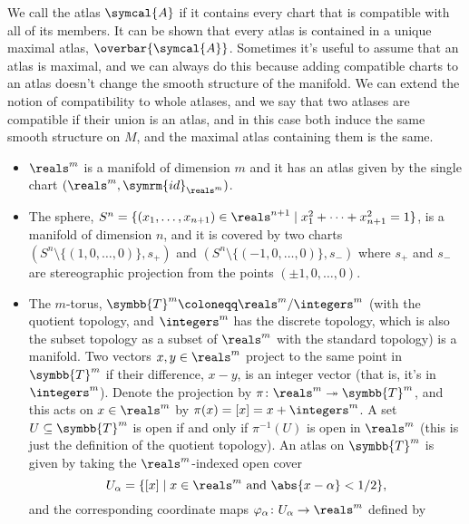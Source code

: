 \documentclass[fleqn]{NotesClass}
\newcommand{\id}{\symrm{id}}
\newcommand{\atlas}{\symcal{A}}
\newcommand{\torus}{\symbb{T}}
\begin{document}
    We call the atlas \(\atlas\)  if it contains every chart that is compatible with all of its members.
    It can be shown that every atlas is contained in a unique maximal atlas, \(\overbar{\atlas}\).
    Sometimes it's useful to assume that an atlas is maximal, and we can always do this because adding compatible charts to an atlas doesn't change the smooth structure of the manifold.
    We can extend the notion of compatibility to whole atlases, and we say that two atlases are compatible if their union is an atlas, and in this case both induce the same smooth structure on \(M\), and the maximal atlas containing them is the same.
    
    \begin{exm}{}{}
        \begin{itemize}
            \item \(\reals^m\) is a manifold of dimension \(m\) and it has an atlas given by the single chart \((\reals^m, \id_{\reals^m})\).
            \item The sphere, \(S^n = \{(x_1, \dotsc, x_{n + 1}) \in \reals^{n+1} \mid x_1^2 + \dotsb + x_{n+1}^2 = 1\}\), is a manifold of dimension \(n\), and it is covered by two charts \((S^n \setminus \{(1, 0, \dotsc, 0)\}, s_+)\) and \((S^n \setminus \{(-1, 0, \dotsc, 0)\}, s_-)\) where \(s_+\) and \(s_-\) are stereographic projection from the points \((\pm 1, 0, \dotsc, 0)\).
            \item The \(m\)-torus, \(\torus^m \coloneqq \reals^m/\integers^m\) (with the quotient topology, and \(\integers^m\) has the discrete topology, which is also the subset topology as a subset of \(\reals^m\) with the standard topology) is a manifold.
            Two vectors \(x, y \in \reals^m\) project to the same point in \(\torus^m\) if their difference, \(x - y\), is an integer vector (that is, it's in \(\integers^m\)).
            Denote the projection by \(\pi \colon \reals^m \twoheadrightarrow \torus^m\), and this acts on \(x \in \reals^m\) by \(\pi(x) = [x] = x + \integers^m\).
            A set \(U \subseteq \torus^m\) is open if and only if \(\pi^{-1}(U)\) is open in \(\reals^m\) (this is just the definition of the quotient topology).
            An atlas on \(\torus^m\) is given by taking the \(\reals^m\)-indexed open cover
            \begin{equation}
                U_\alpha = \{[x] \mid x \in \reals^m \text{ and } \abs{x - \alpha} < 1/2\},
            \end{equation}
            and the corresponding coordinate maps \(\varphi_\alpha \colon U_\alpha \to \reals^m\) defined by

\end{itemize}
\end{exm}
\end{document}
